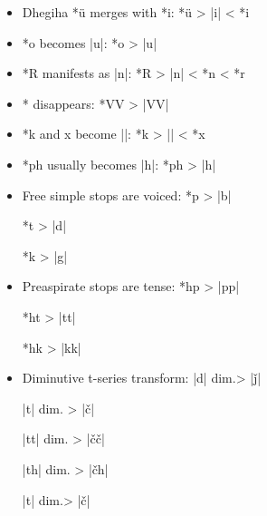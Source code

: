 \documentclass[output=paper]{LSP/langsci}
\begin{document}
\begin{itemize}
\item Dhegiha *\"u merges with *i: \hspace{1em} *\"u	>	|i|	<	*i
\item *o becomes |u|: \hspace{6em} *o	>	|u|
\item *R manifests as |n|: \hspace{4.2em} *R	>	|n|	<	*n < *r
\item *\textsuperscript{} disappears: \hspace{6.2em} *V\textsuperscript{}V	>	|VV|
\item *k\textsuperscript{} and x\textsuperscript{} become |\textsuperscript{}|:	\hspace{3.2em} *k\textsuperscript{}	>	|\textsuperscript{}|	<	*x\textsuperscript{}
\item *ph usually becomes |h|: \hspace{2.2em} *ph	>	|h|

\item Free simple stops are voiced:	\hspace{1em}*p	>	|b|

\hspace{13em} *t	>	|d|

\hspace{13em}*k	>	|g|

\item Preaspirate stops are tense: \hspace{1em} *hp	>	|pp|

\hspace{12.5em} *ht	>	|tt|
					
\hspace{12.5em} *hk	>	|kk|

\item Diminutive t-series transform:	\hspace{1.1em} |d|	dim.>	|\v{j}|

\hspace{14em} |t|	dim. >	|\v{c}|
					
\hspace{14em} |tt|	dim. >	|\v{c}\v{c}|

\hspace{14em} |th|	dim. >	|\v{c}h|

\hspace{14em} |t\textsuperscript{}|	dim.>	|\v{c}\textsuperscript{}|
\end{itemize}
\end{document}
